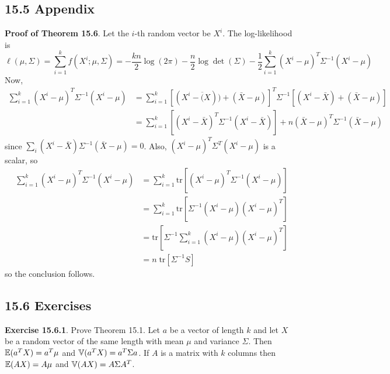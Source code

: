 \subsection*{15.5 Appendix}\label{appendix:multivariate}
\textbf{Proof of Theorem 15.6}. Let the \(i\)-th random vector be
\(X^{i}\). The log-likelihood is
\[
\ell(\mu, \Sigma) = \sum_{i = 1}^{k} f(X^{i}; \mu, \Sigma) 
= -\frac{kn}{2} \log ( 2\pi ) - \frac{n}{2} \log \det \left( \Sigma \right)
- \frac{1}{2} \sum_{i=1}^{k} (X^{i} - \mu)^T \Sigma^{-1} (X^{i} - \mu)
\]
Now,
\begin{align*}
\sum_{i=1}^{k} (X^{i} - \mu)^T \Sigma^{-1} (X^{i} - \mu) &=
\sum_{i=1}^{k} \left[ (X^{i} - \overline(X)) + (\bar{X} - \mu) \right]^T \Sigma^{-1} \left[(X^{i} - \bar{X}) + (\bar{X} - \mu) \right] \\
&= \sum_{i=1}^{k} [(X^{i} - \bar{X})^T\Sigma^{-1}(X^{i} - \bar{X})]
+ n (\bar{X} - \mu)^T \Sigma^{-1} (\bar{X} - \mu)
\end{align*}
since
\(\sum_{i} (X^{i} - \bar{X}) \Sigma^{-1} (\bar{X} - \mu) = 0\).
Also, \((X^{i} - \mu)^T \Sigma^T (X^{i} - \mu)\) is a scalar, so
\begin{align*}
\sum_{i=1}^{k} (X^{i} - \mu)^T \Sigma^{-1} (X^{i} - \mu) &=
\sum_{i=1}^{k} \text{tr} \left[ (X^{i} - \mu)^T \Sigma^{-1} (X^{i} - \mu)\right] \\
&= \sum_{i=1}^{k} \text{tr} \left[ \Sigma^{-1} (X^{i} - \mu) (X^{i} - \mu)^T \right] \\
&= \text{tr} \left[ \Sigma^{-1} \sum_{i=1}^{k} (X^{i} - \mu) (X^{i} - \mu) ^T \right] \\
&= n \; \text{tr} \left[ \Sigma^{-1} S\right]
\end{align*}
so the conclusion follows.

\subsection*{15.6 Exercises}

\textbf{Exercise 15.6.1}. Prove Theorem 15.1.
Let \(a\) be a vector of length \(k\) and let \(X\) be a random vector
of the same length with mean \(\mu\) and variance \(\Sigma\). Then
\(\operatorname{\mathbb{E}}(a^T X) = a^T\mu\) and \(\operatorname{\mathbb{V}}(a^T X) = a^T \Sigma a\).
If \(A\) is a matrix with \(k\) columns then \(\operatorname{\mathbb{E}}(AX) = A\mu\)
and \(\operatorname{\mathbb{V}}(AX) = A \Sigma A^T\).

